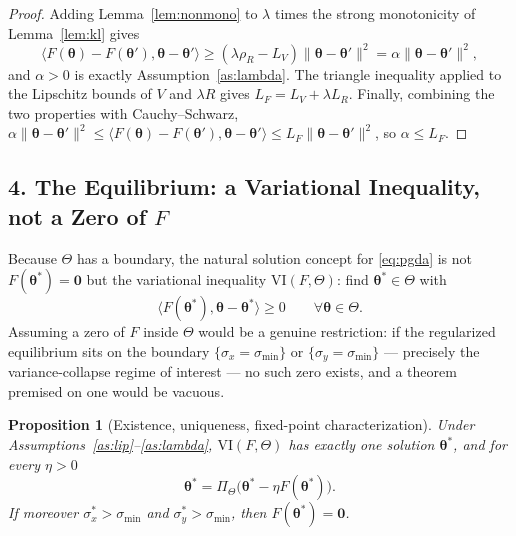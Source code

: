 \documentclass{article}
\newtheorem{proposition}[theorem]{Proposition}
\theoremstyle{definition}
\theoremstyle{remark}
\begin{document}
\begin{proof}
Adding Lemma~\ref{lem:nonmono} to $\lambda$ times the strong monotonicity of Lemma~\ref{lem:kl} gives
\begin{equation}
\langle F(\boldsymbol{\theta}) - F(\boldsymbol{\theta}'), \boldsymbol{\theta} - \boldsymbol{\theta}' \rangle
\ge (\lambda \rho_R - L_V) \|\boldsymbol{\theta} - \boldsymbol{\theta}'\|^{2}
= \alpha \|\boldsymbol{\theta} - \boldsymbol{\theta}'\|^{2},
\end{equation}
and $\alpha > 0$ is exactly Assumption~\ref{as:lambda}. The triangle inequality applied to the Lipschitz
bounds of $V$ and $\lambda R$ gives $L_F = L_V + \lambda L_R$. Finally, combining the two properties with
Cauchy--Schwarz,
$\alpha \|\boldsymbol{\theta} - \boldsymbol{\theta}'\|^{2}
\le \langle F(\boldsymbol{\theta}) - F(\boldsymbol{\theta}'), \boldsymbol{\theta} - \boldsymbol{\theta}' \rangle
\le L_F \|\boldsymbol{\theta} - \boldsymbol{\theta}'\|^{2}$, so $\alpha \le L_F$.
\end{proof}

\subsection*{4. The Equilibrium: a Variational Inequality, not a Zero of $F$}

Because $\Theta$ has a boundary, the natural solution concept for \eqref{eq:pgda} is not $F(\boldsymbol{\theta}^*) = \mathbf{0}$
but the variational inequality $\mathrm{VI}(F, \Theta)$: find $\boldsymbol{\theta}^* \in \Theta$ with
\begin{equation}\label{eq:vi}
\langle F(\boldsymbol{\theta}^*), \boldsymbol{\theta} - \boldsymbol{\theta}^* \rangle \ge 0
\qquad \forall \boldsymbol{\theta} \in \Theta .
\end{equation}
Assuming a zero of $F$ inside $\Theta$ would be a genuine restriction: if the regularized equilibrium sits on
the boundary $\{\sigma_x = \sigma_{\min}\}$ or $\{\sigma_y = \sigma_{\min}\}$ --- precisely the variance-collapse
regime of interest --- no such zero exists, and a theorem premised on one would be vacuous.

\begin{proposition}[Existence, uniqueness, fixed-point characterization]\label{prop:vi}
Under Assumptions~\ref{as:lip}--\ref{as:lambda}, $\mathrm{VI}(F,\Theta)$ has exactly one solution
$\boldsymbol{\theta}^*$, and for every $\eta > 0$
\begin{equation}\label{eq:fixed}
\boldsymbol{\theta}^* = \Pi_\Theta\big(\boldsymbol{\theta}^* - \eta F(\boldsymbol{\theta}^*)\big).
\end{equation}
If moreover $\sigma_x^* > \sigma_{\min}$ and $\sigma_y^* > \sigma_{\min}$, then $F(\boldsymbol{\theta}^*) = \mathbf{0}$.
\end{proposition}
\end{document}
